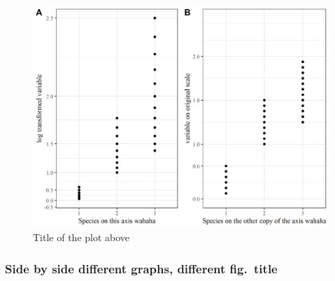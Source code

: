 \documentclass[
]{article}
\begin{document}
\begin{figure}[H]

{\centering \includegraphics[width=0.9\linewidth]{cookbook_files/figure-latex/two_log_norm_plot-1} 

}

\caption{Title of the plot above}\label{fig:two_log_norm_plot}
\end{figure}

\newpage

\hypertarget{side-by-side-different-graphs-different-fig.-title}{%
\subsubsection{Side by side different graphs, different
fig.~title}\label{side-by-side-different-graphs-different-fig.-title}}
\end{document}
